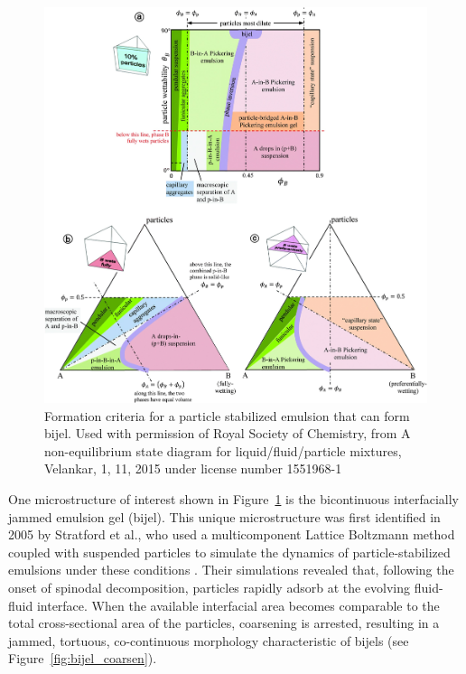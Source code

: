 \begin{figure}
    \centering
    \includegraphics[scale = 0.3]{figures/literature_review/state_diagram.jpg}
    \caption{Formation criteria for a particle stabilized emulsion that can form bijel. \cite{velankar_non-equilibrium_2015}
            Used with permission of Royal Society of Chemistry, from A non-equilibrium state diagram for liquid/fluid/particle 
            mixtures, Velankar, 1, 11, 2015 under license number 1551968-1}
    \label{fig:state_diagram_particle_emulsions}
\end{figure}

One microstructure of interest shown in Figure~\ref{fig:state_diagram_particle_emulsions} is the bicontinuous interfacially jammed emulsion gel (bijel). This unique microstructure was 
first identified in 2005 by Stratford et al., who used a multicomponent Lattice Boltzmann method coupled with suspended particles to simulate the 
dynamics of particle-stabilized emulsions under these conditions \cite{stratford_colloidal_2005}. Their simulations revealed that, following the onset of spinodal decomposition, particles 
rapidly adsorb at the evolving fluid-fluid interface. When the available interfacial area becomes comparable to the total cross-sectional area of the particles, coarsening is arrested, 
resulting in a jammed, tortuous, co-continuous morphology characteristic of bijels (see Figure~\ref{fig:bijel_coarsen}).

